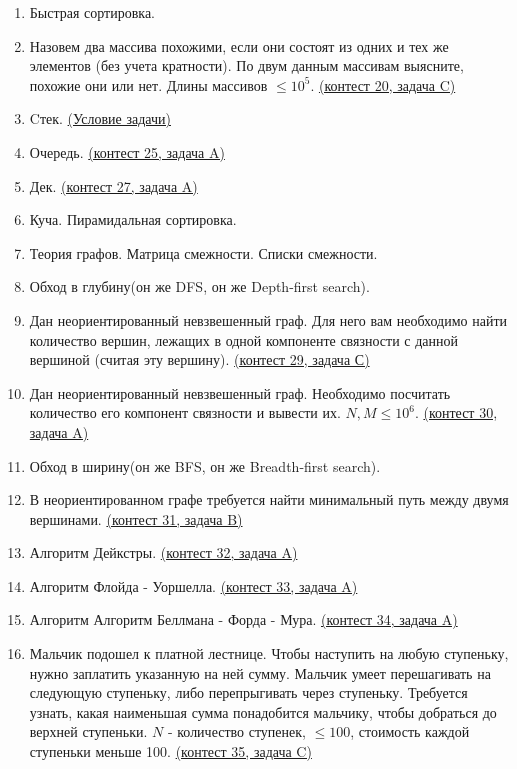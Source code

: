 \documentclass[a4paper,12pt]{article}
\begin{document}
\begin{enumerate}
\item Быстрая сортировка.
\item Назовем два массива похожими, если они состоят из одних и тех же элементов (без учета кратности). По двум данным массивам выясните, похожие они или нет. Длины массивов $\le 10^5$. \href{https://informatics.msk.ru/mod/statements/view3.php?chapterid=767}{(контест 20, задача C)}
\item Cтек. \href{https://informatics.msk.ru/mod/statements/view3.php?chapterid=54}{(Условие задачи)}
\item Очередь. \href{https://informatics.msk.ru/mod/statements/view3.php?chapterid=57}{(контест 25, задача A)}
\item Дек. \href{https://informatics.msk.ru/mod/statements/view3.php?chapterid=60}{(контест 27, задача A)}
\item Куча. Пирамидальная сортировка.
\item Теория графов. Матрица смежности. Списки смежности.
\item Обход в глубину(он же DFS, он же Depth-first search).
\item Дан неориентированный невзвешенный граф. Для него вам необходимо найти количество вершин, лежащих в одной компоненте связности с данной вершиной (считая эту вершину). \href{https://informatics.msk.ru/mod/statements/view3.php?chapterid=165}{(контест 29, задача С)}
\item Дан неориентированный невзвешенный граф. Необходимо посчитать количество его компонент связности и вывести их. $N, M \le 10^6$. \href{https://informatics.msk.ru/mod/statements/view3.php?chapterid=111540}{(контест 30, задача A)}
\item Обход в ширину(он же BFS, он же Breadth-first search).
\item В неориентированном графе требуется найти минимальный путь между двумя вершинами. \href{https://informatics.msk.ru/mod/statements/view3.php?chapterid=160}{(контест 31, задача B)}
\item Алгоритм Дейкстры. \href{https://informatics.msk.ru/mod/statements/view3.php?chapterid=5}{(контест 32, задача A)}
\item Алгоритм Флойда - Уоршелла. \href{https://informatics.msk.ru/mod/statements/view3.php?chapterid=171}{(контест 33, задача A)}
\item Алгоритм Алгоритм Беллмана - Форда - Мура. \href{https://informatics.msk.ru/mod/statements/view3.php?chapterid=178}{(контест 34, задача A)}
\item Мальчик подошел к платной лестнице. Чтобы наступить на любую ступеньку, нужно заплатить указанную на ней сумму. Мальчик умеет перешагивать на следующую ступеньку, либо перепрыгивать через ступеньку. Требуется узнать, какая наименьшая сумма понадобится мальчику, чтобы добраться до верхней ступеньки. $N$ - количество ступенек, $\le 100$, стоимость каждой ступеньки меньше 100. \href{https://informatics.msk.ru/mod/statements/view3.php?chapterid=915}{(контест 35, задача C)}

\end{enumerate}
\end{document}
